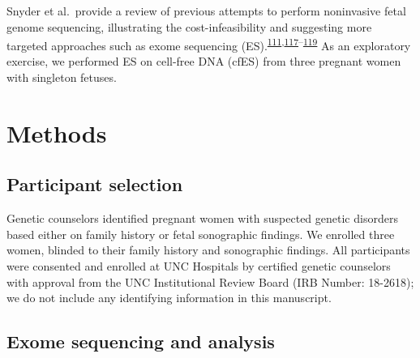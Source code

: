 \documentclass[11pt,letterpaper,oneside]{book}
\begin{document}
Snyder et al.~provide a review of previous attempts to perform noninvasive fetal genome sequencing, illustrating the cost-infeasibility and suggesting more targeted approaches such as exome sequencing (ES).\textsuperscript{\protect\hyperlink{ref-lo:2010aa}{111},\protect\hyperlink{ref-fan:2012aa}{117}--\protect\hyperlink{ref-snyder:2013aa}{119}}
As an exploratory exercise, we performed ES on cell-free DNA (cfES) from three pregnant women with singleton fetuses.

\hypertarget{methods-1}{%
\section{Methods}\label{methods-1}}

\hypertarget{participant-selection}{%
\subsection{Participant selection}\label{participant-selection}}

Genetic counselors identified pregnant women with suspected genetic disorders based either on family history or fetal sonographic findings.
We enrolled three women, blinded to their family history and sonographic findings.
All participants were consented and enrolled at UNC Hospitals by certified genetic counselors with approval from the UNC Institutional Review Board (IRB Number: 18-2618); we do not include any identifying information in this manuscript.

\hypertarget{exome-sequencing-and-analysis}{%
\subsection{Exome sequencing and analysis}\label{exome-sequencing-and-analysis}}
\end{document}

